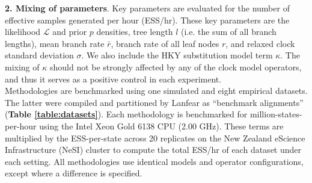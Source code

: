 \documentclass[10pt,letterpaper]{article}
\begin{document}
\textbf{2. Mixing of parameters}. Key parameters are evaluated for the number of effective samples generated per hour (ESS/hr).
These key parameters are the likelihood $\mathcal{L}$ and prior $p$ densities,  tree length $l$ (i.e. the sum of all branch lengths), mean branch rate $\bar{r}$, branch rate of all leaf nodes $r$, and relaxed clock standard deviation $\sigma$.
We also include the HKY substitution model term $\kappa$. 
The mixing of $\kappa$ should not be strongly affected by any of the clock model operators, and thus it serves as a positive control in each experiment. \\




Methodologies are benchmarked using one simulated and eight empirical datasets.
The latter were compiled \cite{lanfear2019Github} and partitioned \cite{lanfear2016partitionfinder} by Lanfear as ``benchmark alignments'' (\textbf{Table \ref{table:datasets}}).
Each methodology is benchmarked for million-states-per-hour using the Intel Xeon Gold 6138 CPU (2.00 GHz).
These terms are multiplied by the ESS-per-state across 20 replicates on the New Zealand eScience Infrastructure (NeSI) cluster to compute the total ESS/hr of each dataset under each setting.
All methodologies use identical models and operator configurations, except where a difference is specified.


\end{document}
